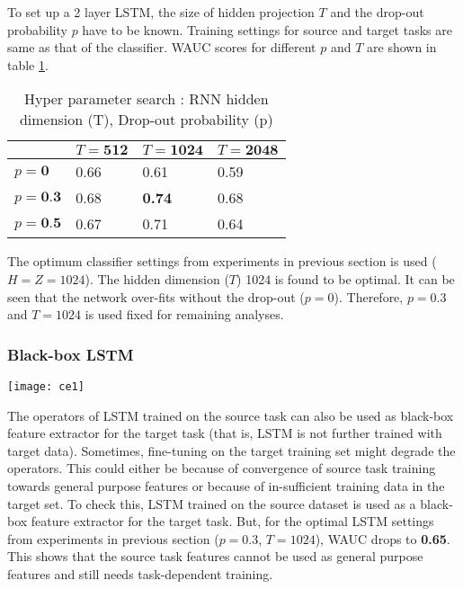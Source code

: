 \noindent To set up a 2 layer LSTM, the size of hidden projection $T$ and the drop-out probability $p$ have to be known. Training settings for source and target tasks are same as that of the classifier. WAUC scores for different  $p$ and $T$ are shown in table \ref{tabl:a4}.
\begin{table}[H]
\label{tabl:a4}
\centering
\begin{tabular}{| p{} | p{}| p{}| p{} |}
\hline
& $T = \textbf{512}$ & $T = \textbf{1024}$ & $T = \textbf{2048}$\\
\hline
$p = \textbf{0}$  & 0.66 & 0.61 & 0.59\\
\hline
$p = \textbf{0.3}$ & 0.68 & \textbf{0.74} & 0.68\\ 
\hline
$p = \textbf{0.5}$ & 0.67 & 0.71 & 0.64\\
\hline
\end{tabular}
\caption{Hyper parameter search : RNN hidden dimension (T), Drop-out probability (p)} 
\end{table}
\FloatBarrier

\noindent The optimum classifier settings from experiments in previous section is used ($H = Z = 1024$). The hidden dimension ($T$) 1024 is found to be optimal. It can be seen that the network over-fits without the drop-out ($p = 0$). Therefore, $p = 0.3$ and $T = 1024$ is used fixed for remaining analyses.

\subsubsection{Black-box LSTM}
\begin{minipage}{0.15\textwidth}
\texttt{[image: ce1]}
\end{minipage}
\begin{minipage}{0.80\textwidth}
The operators of LSTM trained on the source task can also be used as black-box feature extractor for the target task (that is, LSTM is not further trained with target data). Sometimes, fine-tuning on the target training set might degrade the operators. This could either be because of convergence of source task training towards general purpose features or because of in-sufficient training data in the target set. To check this, LSTM trained on the source dataset is used as a black-box feature extractor for the target task. But, for the optimal LSTM settings from experiments in previous section ($p = 0.3$, $T=1024$), WAUC drops to \textbf{0.65}. This shows that the source task features cannot be used as general purpose features and still needs task-dependent training. 
\end{minipage}

